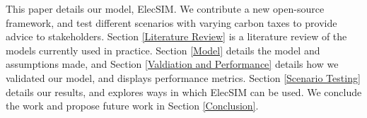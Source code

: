 This paper details our model, ElecSIM. We contribute a new open-source framework, and test different scenarios with varying carbon taxes to provide advice to stakeholders. Section \ref{Literature Review} is a literature review of the models currently used in practice. Section \ref{Model} details the model and assumptions made, and Section \ref{Valdiation and Performance} details how we validated our model, and displays performance metrics. Section \ref{Scenario Testing} details our results, and explores ways in which ElecSIM can be used. We conclude the work and propose future work in Section \ref{Conclusion}.




%




